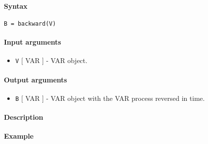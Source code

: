 


	\paragraph{Syntax}\label{syntax}

\begin{verbatim}
B = backward(V)
\end{verbatim}

\paragraph{Input arguments}\label{input-arguments}

\begin{itemize}
\itemsep1pt\parskip0pt
\item
  \texttt{V} {[} VAR {]} - VAR object.
\end{itemize}

\paragraph{Output arguments}\label{output-arguments}

\begin{itemize}
\itemsep1pt\parskip0pt
\item
  \texttt{B} {[} VAR {]} - VAR object with the VAR process reversed in
  time.
\end{itemize}

\paragraph{Description}\label{description}

\paragraph{Example}\label{example}


